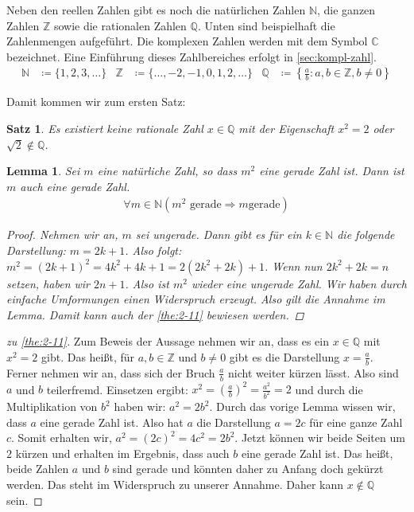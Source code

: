 \documentclass[ngerman,titlepage,twoside, parskip=half*]{scrreprt}
\newcommand*{\N}{\mathbb{N}}
\newcommand*{\Z}{\mathbb{Z}}
\newcommand*{\Q}{\mathbb{Q}}
\newcommand*{\C}{\mathbb{C}}
\theoremstyle{break}
\newtheorem{lemma}{Lemma}
\newtheorem{theorem}{Satz}[section]
\theoremstyle{nonumberbreak}
\newtheorem{proof}{Beweis:}
\begin{document}
Neben den reellen Zahlen gibt es noch die natürlichen Zahlen $\N$, die
ganzen Zahlen $\Z$ sowie die rationalen Zahlen $\Q$. Unten sind
beispielhaft die Zahlenmengen aufgeführt. Die komplexen Zahlen werden mit dem
Symbol $\C$ bezeichnet. Eine Einführung dieses Zahlbereiches erfolgt in
\autoref{sec:kompl-zahl}.
\begin{align*}
\N &\coloneqq \{1,2,3,\ldots\} &
\Z &\coloneqq \{\ldots ,-2,-1,0,1,2,\ldots\} &
\Q &\coloneqq \left\{\frac{a}{b}\colon a,b\in \Z, b \neq 0\right\}
\end{align*}

Damit kommen wir zum ersten Satz:
\begin{theorem}
  \label{the:2-11}
  Es existiert keine rationale Zahl $x\in \Q$ mit der Eigenschaft
  $x^2=2$ oder $\sqrt{2}\notin \Q$.
\end{theorem}

\begin{lemma}
  Sei $m$ eine natürliche Zahl, so dass $m^2$ eine gerade Zahl
  ist. Dann ist $m$ auch eine gerade Zahl.
  \begin{gather*}
    \forall m \in \N (m^2 \text{ gerade}\Rightarrow m \text{
      gerade})
  \end{gather*}
  \begin{proof}
    Nehmen wir an, $m$ sei ungerade. Dann gibt es für ein $k \in\N$
    die folgende
    Darstellung: $m=2k+1$. Also folgt: $m^{2}= (2k+1)^{2} = 4k^{2}+ 4k+1=
    2(2k^{2}+2k)+1$. Wenn nun $2k^{2}+2k=n$ setzen, haben wir $2n+1$. Also ist
    $m^{2}$ wieder eine ungerade Zahl. Wir haben durch einfache Umformungen
    einen Widerspruch erzeugt. Also gilt die Annahme im Lemma. Damit
    kann auch der \autoref{the:2-11} bewiesen werden.
  \end{proof}
\end{lemma}

\begin{proof}[zu \autoref{the:2-11}]
  Zum Beweis der Aussage nehmen wir an, dass es ein $x\in\Q$ mit $x^{2}=2$
  gibt. Das heißt, für $a,b\in\Z$ und $b\neq0$ gibt es die Darstellung
  $x=\frac{a}{b}$. Ferner nehmen wir an, dass sich der Bruch $\frac{a}{b}$
  nicht weiter kürzen lässt. Also sind $a$ und $b$ teilerfremd. Einsetzen
  ergibt: $x^{2}= (\frac{a}{b})^{2}= \frac{a^{2}}{b^{2}}=2$ und durch die
  Multiplikation von $b^{2}$ haben wir: $a^{2}= 2b^{2}$. Durch das vorige
  Lemma wissen wir, dass $a$ eine gerade Zahl ist. Also hat $a$ die
  Darstellung $a=2c$ für eine ganze Zahl $c$. Somit erhalten wir, $a^{2}=
  (2c)^{2}= 4c^{2}= 2b^{2}$. Jetzt können wir beide Seiten um $2$ kürzen und
  erhalten im Ergebnis, dass auch $b$ eine gerade Zahl ist. Das heißt, beide
  Zahlen $a$ und $b$ sind gerade und könnten daher zu Anfang doch gekürzt
  werden. Das steht im Widerspruch zu unserer Annahme. Daher kann $x\notin\Q$
  sein.
\end{proof}
\end{document}
